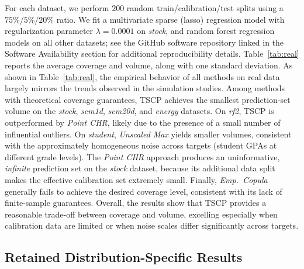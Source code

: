 For each dataset, we perform $200$ random train/calibration/test splits using a $75\%/5\%/20\%$ ratio. We fit a multivariate sparse (lasso) regression model with regularization parameter $\lambda = 0.0001$ on \emph{stock}, and random forest regression models on all other datasets; see the GitHub software repository linked in the Software Availability section for additional reproducibility details.
Table~\ref{tab:real} reports the average coverage and volume, along with one standard deviation.
As shown in Table~\ref{tab:real}, the empirical behavior of all methods on real data largely mirrors the trends observed in the simulation studies. Among methods with theoretical coverage guarantees, TSCP achieves the smallest prediction-set volume on the \emph{stock}, \emph{scm1d}, \emph{scm20d}, and \emph{energy} datasets. On \emph{rf2}, TSCP is outperformed by \emph{Point CHR}, likely due to the presence of a small number of influential outliers. On \emph{student}, \emph{Unscaled Max} yields smaller volumes, consistent with the approximately homogeneous noise across targets (student GPAs at different grade levels).
The \emph{Point CHR} approach produces an uninformative, \emph{infinite} prediction set on the \emph{stock} dataset, because its additional data split makes the effective calibration set extremely small.
Finally, \emph{Emp.~Copula} generally fails to achieve the desired coverage level, consistent with its lack of finite-sample guarantees.
Overall, the results show that TSCP provides a reasonable trade-off between coverage and volume, excelling especially when calibration data are limited or when noise scales differ significantly across targets.

\begin{table}[!htbp]

\caption{Performance of the proposed TSCP method and alternative conformal prediction approaches on real datasets. Results are averaged over $200$ random splits of the data into training/calibration/and test subsets, with one standard deviation reported in parentheses. The target coverage level is $0.9$. Coverage values below the target are highlighted in \textcolor{red}{red}, and the smallest volume among methods achieving valid coverage is highlighted in \textbf{bold}.}
\label{tab:real}
\end{table}

\FloatBarrier
\subsection{Retained Distribution-Specific Results}
\label{app:legacy-supplement}

